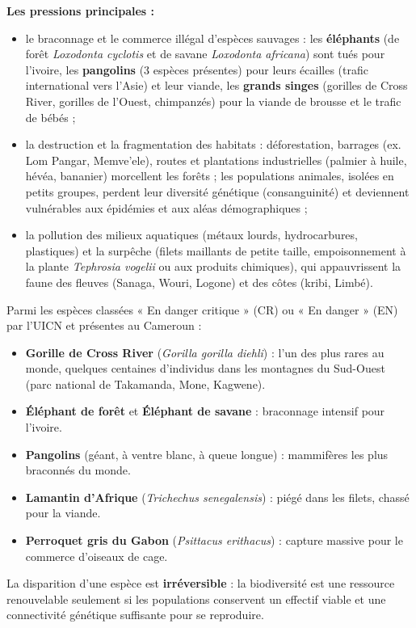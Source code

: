 \documentclass[11pt]{article}
\newcommand{\cle}[1]{{\popxbold\color{popdark}#1}}
\begin{document}
\textbf{Les pressions principales :}
\begin{itemize}
  \item le \cle{braconnage} et le commerce illégal d'espèces sauvages : les \textbf{éléphants} (de forêt \emph{Loxodonta cyclotis} et de savane \emph{Loxodonta africana}) sont tués pour l'ivoire, les \textbf{pangolins} (3 espèces présentes) pour leurs écailles (trafic international vers l'Asie) et leur viande, les \textbf{grands singes} (gorilles de Cross River, gorilles de l'Ouest, chimpanzés) pour la viande de brousse et le trafic de bébés ;
  \item la \cle{destruction et la fragmentation des habitats} : déforestation, barrages (ex. Lom Pangar, Memve'ele), routes et plantations industrielles (palmier à huile, hévéa, bananier) morcellent les forêts ; les populations animales, isolées en petits groupes, perdent leur diversité génétique (consanguinité) et deviennent vulnérables aux épidémies et aux aléas démographiques ;
  \item la pollution des milieux aquatiques (métaux lourds, hydrocarbures, plastiques) et la \cle{surpêche} (filets maillants de petite taille, empoisonnement à la plante \emph{Tephrosia vogelii} ou aux produits chimiques), qui appauvrissent la faune des fleuves (Sanaga, Wouri, Logone) et des côtes (kribi, Limbé).
\end{itemize}

\begin{aretenir}
Parmi les espèces classées « En danger critique » (CR) ou « En danger » (EN) par l'UICN et présentes au Cameroun :
\begin{itemize}
  \item \textbf{Gorille de Cross River} (\emph{Gorilla gorilla diehli}) : l'un des plus rares au monde, quelques centaines d'individus dans les montagnes du Sud-Ouest (parc national de Takamanda, Mone, Kagwene).
  \item \textbf{Éléphant de forêt} et \textbf{Éléphant de savane} : braconnage intensif pour l'ivoire.
  \item \textbf{Pangolins} (géant, à ventre blanc, à queue longue) : mammifères les plus braconnés du monde.
  \item \textbf{Lamantin d'Afrique} (\emph{Trichechus senegalensis}) : piégé dans les filets, chassé pour la viande.
  \item \textbf{Perroquet gris du Gabon} (\emph{Psittacus erithacus}) : capture massive pour le commerce d'oiseaux de cage.
\end{itemize}
La disparition d'une espèce est \textbf{irréversible} : la biodiversité est une ressource renouvelable seulement si les populations conservent un effectif viable et une connectivité génétique suffisante pour se reproduire.
\end{aretenir}
\end{document}
